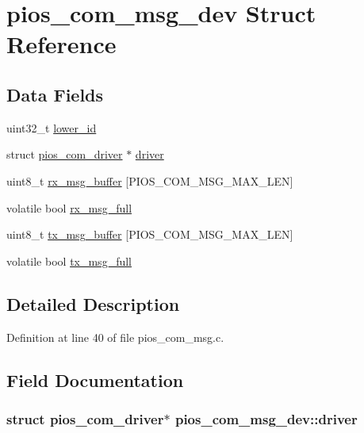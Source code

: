 \hypertarget{structpios__com__msg__dev}{\section{pios\-\_\-com\-\_\-msg\-\_\-dev \-Struct \-Reference}
\label{structpios__com__msg__dev}
}
\subsection*{\-Data \-Fields}
\begin{DoxyCompactItemize}
\item 
uint32\-\_\-t \hyperlink{structpios__com__msg__dev_a08cc90d0b7c8cd94cd589c948234869b}{lower\-\_\-id}
\item 
struct \hyperlink{structpios__com__driver}{pios\-\_\-com\-\_\-driver} $\ast$ \hyperlink{structpios__com__msg__dev_a776368775bf0a23a210d33ce79a0f620}{driver}
\item 
uint8\-\_\-t \hyperlink{structpios__com__msg__dev_ab1901ce323a85aa3e31dc1b965b0ce01}{rx\-\_\-msg\-\_\-buffer} \mbox{[}\-P\-I\-O\-S\-\_\-\-C\-O\-M\-\_\-\-M\-S\-G\-\_\-\-M\-A\-X\-\_\-\-L\-E\-N\mbox{]}
\item 
volatile bool \hyperlink{structpios__com__msg__dev_a38043f348bd99edfb297de34bda052e4}{rx\-\_\-msg\-\_\-full}
\item 
uint8\-\_\-t \hyperlink{structpios__com__msg__dev_a7155e93159cd5cfcd394884b8ceaa78b}{tx\-\_\-msg\-\_\-buffer} \mbox{[}\-P\-I\-O\-S\-\_\-\-C\-O\-M\-\_\-\-M\-S\-G\-\_\-\-M\-A\-X\-\_\-\-L\-E\-N\mbox{]}
\item 
volatile bool \hyperlink{structpios__com__msg__dev_acfd2f035cc532f5f6869277283be397b}{tx\-\_\-msg\-\_\-full}
\end{DoxyCompactItemize}


\subsection{\-Detailed \-Description}


\-Definition at line 40 of file pios\-\_\-com\-\_\-msg.\-c.



\subsection{\-Field \-Documentation}
\hypertarget{structpios__com__msg__dev_a776368775bf0a23a210d33ce79a0f620}{
\subsubsection[{driver}]{\setlength{\rightskip}{0pt plus 5cm}struct {\bf pios\-\_\-com\-\_\-driver}$\ast$ {\bf pios\-\_\-com\-\_\-msg\-\_\-dev\-::driver}}}\label{structpios__com__msg__dev_a776368775bf0a23a210d33ce79a0f620}



